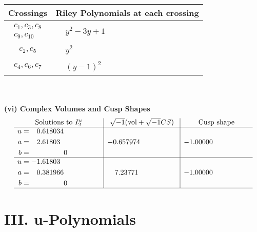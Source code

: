 \documentclass[1p]{elsarticle_modified}
\theoremstyle{definition}
\newcommand{\I}{\sqrt{-1}}
\begin{document}
\begin{tabular}{m{50pt}|m{274pt}}
Crossings & \hspace{64pt}Riley Polynomials at each crossing \\
\hline $$\begin{aligned}c_{1},c_{3},c_{8}\\c_{9},c_{10}\end{aligned}$$&$\begin{aligned}
&y^2-3 y+1
\end{aligned}$\\
\hline $$\begin{aligned}c_{2},c_{5}\end{aligned}$$&$\begin{aligned}
&y^2
\end{aligned}$\\
\hline $$\begin{aligned}c_{4},c_{6},c_{7}\end{aligned}$$&$\begin{aligned}
&(y-1)^2
\end{aligned}$\\
\hline
\end{tabular}\\~\\
\newpage\flushleft \textbf{(vi) Complex Volumes and Cusp Shapes}
$$\begin{array}{c|c|c}  
\text{Solutions to }I^u_{2}& \I (\text{vol} + \sqrt{-1}CS) & \text{Cusp shape}\\
 \hline 
\begin{aligned}
u &= \phantom{-}0.618034\phantom{ +0.000000I} \\
a &= \phantom{-}2.61803\phantom{ +0.000000I} \\
b &= \phantom{-0.000000 } 0\end{aligned}
 & -0.657974\phantom{ +0.000000I} & -1.00000\phantom{ +0.000000I} \\ \hline\begin{aligned}
u &= -1.61803\phantom{ +0.000000I} \\
a &= \phantom{-}0.381966\phantom{ +0.000000I} \\
b &= \phantom{-0.000000 } 0\end{aligned}
 & \phantom{-}7.23771\phantom{ +0.000000I} & -1.00000\phantom{ +0.000000I}\\
 \hline 
 \end{array}$$\newpage
\newpage\renewcommand{\arraystretch}{1}
\centering \section*{ III. u-Polynomials}
\end{document}
